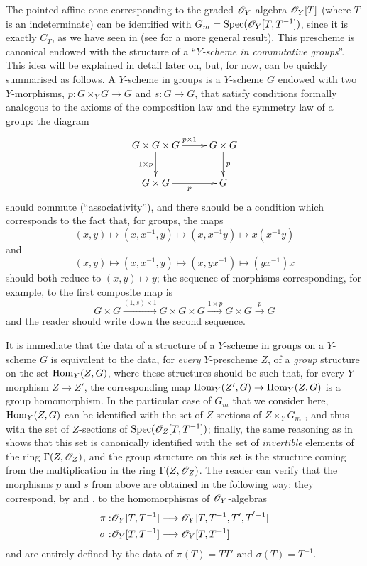 \begin{remark}[8.3.9]
\label{2.8.3.9}
The pointed affine cone corresponding to the graded $\mathscr{O}_Y$-algebra $\mathscr{O}_Y[T]$ (where $T$ is an indeterminate) can be identified with $G_m=\operatorname{Spec}(\mathscr{O}_Y[T,T^{-1}])$, since it is exactly $C_T$, as we have seen in  (see  for a more general result).
This prescheme is canonical endowed with the structure of a ``\emph{$Y$-scheme in commutative groups}''.
This idea will be explained in detail later on, but, for now, can be quickly summarised as follows.
A $Y$-scheme in groups is a $Y$-scheme $G$ endowed with two $Y$-morphisms, $p:G\times_Y G\to G$ and $s:G\to G$, that satisfy conditions formally analogous to the axioms of the composition law and the symmetry law of a group: the diagram
\[
  \xymatrix{
    G \times G \times G
      \ar[r]^{p \times 1}
      \ar[d]_{1 \times p}
  & G \times G
      \ar[d]^{p}
  \\G \times G
      \ar[r]_{p}
  & G
  }
\]
should commute (``associativity''), and there should be a condition which corresponds to the fact that, for groups, the maps
\[
  (x,y)
  \mapsto
  (x,x^{-1},y)
  \mapsto
  (x,x^{-1}y)
  \mapsto
  x(x^{-1}y)
\]
and
\[
  (x,y)
  \mapsto
  (x,x^{-1},y)
  \mapsto
  (x,yx^{-1})
  \mapsto
  (yx^{-1})x
\]
should both reduce to $(x,y)\mapsto y$;
the sequence of morphisms corresponding, for example, to the first composite map is
\[
  G \times G
  \xrightarrow{(1,s) \times 1}
  G \times G \times G
  \xrightarrow{1 \times p}
  G\times G
  \xrightarrow{p}
  G
\]
and the reader should write down the second sequence.

It is immediate  that the data of a structure of a $Y$-scheme in groups on a $Y$-scheme $G$ is equivalent to the data, for \emph{every} $Y$-prescheme $Z$, of a \emph{group} structure on the set $\operatorname{Hom}_Y(Z,G)$, where these structures should be such that, for every $Y$-morphism $Z\to Z'$, the corresponding map $\Hom_Y(Z',G)\to\Hom_Y(Z,G)$ is a group homomorphism.
In the particular case of $G_m$ that we consider here, $\operatorname{Hom}_Y(Z,G)$ can be identified with the set of $Z$-sections of $Z\times_Y G_m$ , and thus with the set of $Z$-sections of $\operatorname{Spec}(\mathscr{O}_Z[T,T^{-1}])$;
finally, the same reasoning as in  shows that this set is canonically identified with the set of \emph{invertible} elements of the ring $\Gamma(Z,\mathscr{O}_Z)$, and the group structure on this set is the structure coming from the multiplication in the ring $\Gamma(Z,\mathscr{O}_Z)$.
The reader can verify that the morphisms $p$ and $s$ from above are obtained in the following way: they correspond, by  and , to the homomorphisms of $\mathscr{O}_Y$-algebras
\begin{align*}
  \pi: &\sh{O}_Y[T,T^{-1}] \to \sh{O}_Y[T,T^{-1},T',T^{'-1}]
\\\sigma: &\sh{O}_Y[T,T^{-1}] \to \sh{O}_Y[T,T^{-1}]
\end{align*}
and are entirely defined by the data of $\pi(T)=TT'$ and $\sigma(T)=T^{-1}$.


\end{remark}
